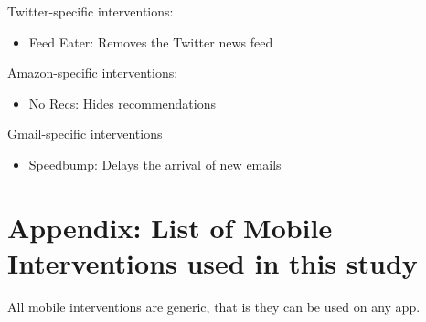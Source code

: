 \vspace{2mm}

Twitter-specific interventions:

\begin{itemize}
    \item Feed Eater: Removes the Twitter news feed
\end{itemize}

\vspace{2mm}

Amazon-specific interventions:

\begin{itemize}
    \item No Recs: Hides recommendations
\end{itemize}

\vspace{2mm}

Gmail-specific interventions

\begin{itemize}
    \item Speedbump: Delays the arrival of new emails
\end{itemize}


\pagebreak

\section{Appendix: List of Mobile Interventions used in this study}

All mobile interventions are generic, that is they can be used on any app.

